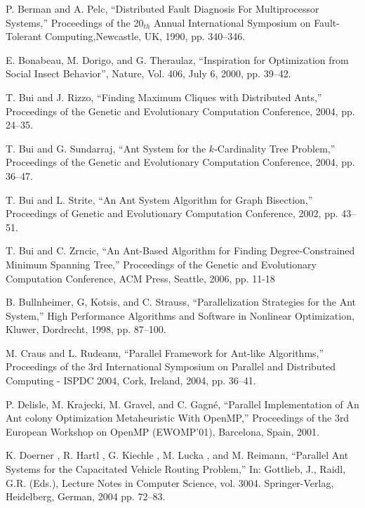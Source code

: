 \documentclass[11pt]{article}
\begin{document}
\begin{thebibliography}{99} 

P. Berman and A. Pelc, 
``Distributed Fault Diagnosis For Multiprocessor Systems,'' Proceedings of the 20$_{th}$ Annual International Symposium on Fault-Tolerant Computing,Newcastle, UK, 1990,  pp. 340--346.

E. Bonabeau, M. Dorigo, and G. Theraulaz, ``Inspiration for Optimization from Social Insect Behavior'', Nature, Vol. 406, July 6, 2000, pp. 39--42.

T. Bui and J. Rizzo, ``Finding Maximum Cliques with Distributed Ants,'' Proceedings of the Genetic and Evolutionary Computation Conference, 2004, pp. 24--35.

T. Bui  and G. Sundarraj,  ``Ant System for the $k$-Cardinality Tree Problem,'' Proceedings of the Genetic and Evolutionary Computation Conference, 2004, pp. 36--47.


T. Bui and L. Strite, ``An Ant System Algorithm for Graph Bisection,'' Proceedings of  Genetic and Evolutionary Computation Conference, 2002, pp. 43--51.

T. Bui and C. Zrncic, ``An Ant-Based Algorithm for Finding Degree-Constrained Minimum Spanning Tree,'' Proceedings of the Genetic and Evolutionary Computation Conference, ACM Press, Seattle, 2006, pp. 11-18

B. Bullnheimer, G, Kotsis, and C. Strauss, ``Parallelization Strategies for the Ant System,'' High Performance Algorithms and Software in Nonlinear Optimization, Kluwer, Dordrecht, 1998, pp. 87--100.

M. Craus  and L. Rudeanu, ``Parallel Framework for Ant-like Algorithms,'' Proceedings of the 3rd International Symposium on Parallel and Distributed Computing - ISPDC 2004, Cork, Ireland, 2004, pp. 36--41.

P. Delisle, M. Krajecki, M. Gravel, and C. Gagn\'e, ``Parallel Implementation of An Ant colony Optimization Metaheuristic With OpenMP,'' Proceedings of the 3rd European Workshop on OpenMP (EWOMP’01), Barcelona, Spain, 2001.


K. Doerner , R. Hartl , G. Kiechle , M. Lucka , and M. Reimann, ``Parallel Ant Systems for the Capacitated Vehicle Routing Problem,'' In: Gottlieb, J., Raidl, G.R. (Eds.), Lecture Notes in Computer Science, vol. 3004. Springer-Verlag, Heidelberg, German, 2004 pp. 72--83.



\end{thebibliography}
\end{document}
